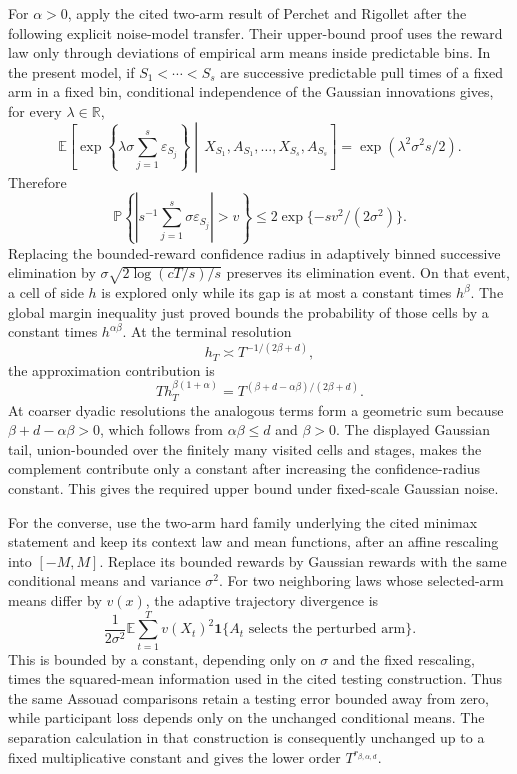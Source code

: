 For \(\alpha>0\), apply the cited two-arm result of Perchet and Rigollet after the following explicit noise-model transfer.  Their upper-bound proof uses the reward law only through deviations of empirical arm means inside predictable bins.  In the present model, if \(S_1<\cdots<S_s\) are successive predictable pull times of a fixed arm in a fixed bin, conditional independence of the Gaussian innovations gives, for every \(\lambda\in\mathbb R\),
\[
\mathbb E\!\left[
 \exp\!\left\{\lambda\sigma\sum_{j=1}^s\varepsilon_{S_j}\right\}
 \middle|\,X_{S_1},A_{S_1},\ldots,X_{S_s},A_{S_s}
\right]
=\exp(\lambda^2\sigma^2s/2).
\]
Therefore
\[
\mathbb P\!\left\{
 \left|s^{-1}\sum_{j=1}^s\sigma\varepsilon_{S_j}\right|>v
\right\}
\leq2\exp\{-sv^2/(2\sigma^2)\}.
\]
Replacing the bounded-reward confidence radius in adaptively binned successive elimination by \(\sigma\sqrt{2\log(cT/s)/s}\) preserves its elimination event.  On that event, a cell of side \(h\) is explored only while its gap is at most a constant times \(h^\beta\).  The global margin inequality just proved bounds the probability of those cells by a constant times \(h^{\alpha\beta}\).  At the terminal resolution
\[
h_T\asymp T^{-1/(2\beta+d)},
\]
the approximation contribution is
\[
T h_T^{\beta(1+\alpha)}
=T^{(\beta+d-\alpha\beta)/(2\beta+d)}.
\]
At coarser dyadic resolutions the analogous terms form a geometric sum because \(\beta+d-\alpha\beta>0\), which follows from \(\alpha\beta\leq d\) and \(\beta>0\).  The displayed Gaussian tail, union-bounded over the finitely many visited cells and stages, makes the complement contribute only a constant after increasing the confidence-radius constant.  This gives the required upper bound under fixed-scale Gaussian noise.

For the converse, use the two-arm hard family underlying the cited minimax statement and keep its context law and mean functions, after an affine rescaling into \([-M,M]\).  Replace its bounded rewards by Gaussian rewards with the same conditional means and variance \(\sigma^2\).  For two neighboring laws whose selected-arm means differ by \(v(x)\), the adaptive trajectory divergence is
\[
\frac{1}{2\sigma^2}\mathbb E\sum_{t=1}^T v(X_t)^2
 \mathbf 1\{A_t\text{ selects the perturbed arm}\}.
\]
This is bounded by a constant, depending only on \(\sigma\) and the fixed rescaling, times the squared-mean information used in the cited testing construction.  Thus the same Assouad comparisons retain a testing error bounded away from zero, while participant loss depends only on the unchanged conditional means.  The separation calculation in that construction is consequently unchanged up to a fixed multiplicative constant and gives the lower order \(T^{r_{\beta,\alpha,d}}\).

